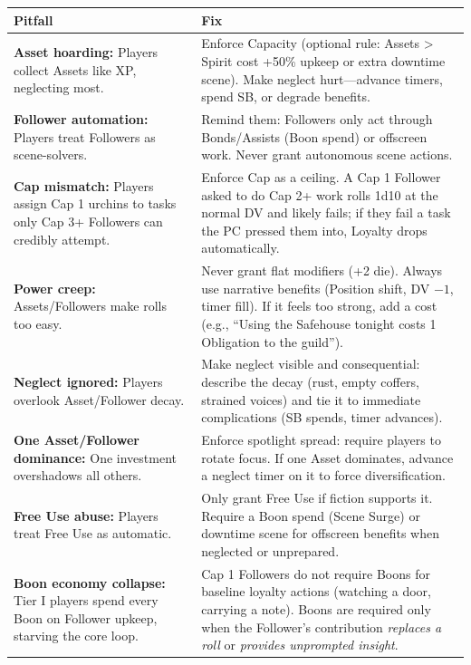 \begin{tabularx}{\linewidth}{lX}
\toprule
\textbf{Pitfall} & \textbf{Fix} \\
\midrule
\textbf{Asset hoarding:} Players collect Assets like XP, neglecting most. & Enforce Capacity (optional rule: Assets > Spirit cost +50\% upkeep or extra downtime scene). Make neglect hurt---advance timers, spend SB, or degrade benefits. \\
\midrule
\textbf{Follower automation:} Players treat Followers as scene-solvers. & Remind them: Followers only act through Bonds/Assists (Boon spend) or offscreen work. Never grant autonomous scene actions. \\
\midrule
\textbf{Cap mismatch:} Players assign Cap 1 urchins to tasks only Cap 3+ Followers can credibly attempt. & Enforce Cap as a ceiling. A Cap 1 Follower asked to do Cap 2+ work rolls 1d10 at the normal DV and likely fails; if they fail a task the PC pressed them into, Loyalty drops automatically. \\
\midrule
\textbf{Power creep:} Assets/Followers make rolls too easy. & Never grant flat modifiers (+2 die). Always use narrative benefits (Position shift, DV $-1$, timer fill). If it feels too strong, add a cost (e.g., ``Using the Safehouse tonight costs 1 Obligation to the guild''). \\
\midrule
\textbf{Neglect ignored:} Players overlook Asset/Follower decay. & Make neglect visible and consequential: describe the decay (rust, empty coffers, strained voices) and tie it to immediate complications (SB spends, timer advances). \\
\midrule
\textbf{One Asset/Follower dominance:} One investment overshadows all others. & Enforce spotlight spread: require players to rotate focus. If one Asset dominates, advance a neglect timer on it to force diversification. \\
\midrule
\textbf{Free Use abuse:} Players treat Free Use as automatic. & Only grant Free Use if fiction supports it. Require a Boon spend (Scene Surge) or downtime scene for offscreen benefits when neglected or unprepared. \\
\midrule
\textbf{Boon economy collapse:} Tier I players spend every Boon on Follower upkeep, starving the core loop. & Cap 1 Followers do not require Boons for baseline loyalty actions (watching a door, carrying a note). Boons are required only when the Follower's contribution \emph{replaces a roll} or \emph{provides unprompted insight}. \\
\bottomrule
\end{tabularx}

